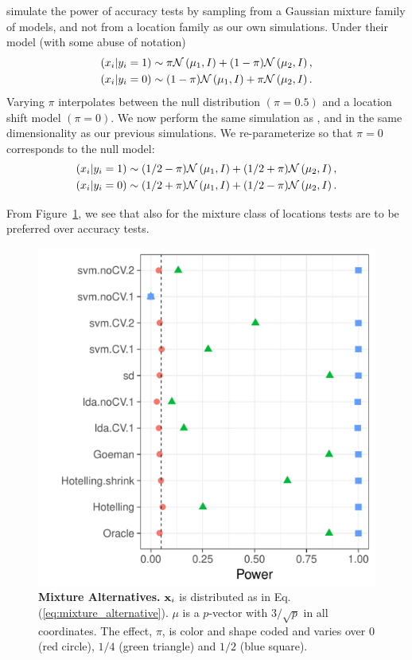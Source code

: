 \documentclass[12pt,a4paper]{article}
\begin{document}
\cite{golland_permutation_2005} simulate the power of accuracy tests by sampling from a Gaussian mixture family of models, and not from a location family as our own simulations. 
Under their model (with some abuse of notation)
\begin{align*}
\begin{split}
	(x_i|y_i=1) & \sim \pi \mathcal{N}\left(\mu_1,I\right)+ (1-\pi) \mathcal{N}\left(\mu_2,I\right), \\
	(x_i|y_i=0) & \sim (1-\pi) \mathcal{N}\left(\mu_1,I\right)+ \pi \mathcal{N}\left(\mu_2,I\right).
\end{split}
\end{align*}
Varying $\pi$ interpolates between the null distribution $(\pi=0.5)$ and a location shift model $(\pi=0)$. 
We now perform the same simulation as \cite{golland_permutation_2005}, and in the same dimensionality as our previous simulations.
We re-parameterize so that $\pi=0$ corresponds to the null model:
\begin{align}
\begin{split}
\label{eq:mixture_alternative}
	(x_i|y_i=1) & \sim (1/2-\pi) \mathcal{N}\left(\mu_1,I\right)+ (1/2+\pi) \mathcal{N}\left(\mu_2,I\right), \\
	(x_i|y_i=0) & \sim (1/2+\pi) \mathcal{N}\left(\mu_1,I\right)+ (1/2-\pi) \mathcal{N}\left(\mu_2,I\right).	
\end{split}
\end{align}

From Figure~\ref{fig:file12}, we see that also for the mixture class of \cite{golland_permutation_2005} locations tests are to be preferred over accuracy tests. 




\begin{figure}[ht]
\centering
	  \includegraphics[width=0.5\linewidth]{"art/file12"}
	  \caption{\textbf{Mixture Alternatives.} $\mathbf{x}_i$ is distributed as in Eq.(\ref{eq:mixture_alternative}). 
	  	$\mu$ is a $p$-vector with $3/\sqrt{p}$ in all coordinates.
	  The effect, $\pi$, is color and shape coded and varies over $0$ (red circle), $1/4$ (green triangle) and $1/2$ (blue square). }
	\label{fig:file12}
\end{figure}
\end{document}
